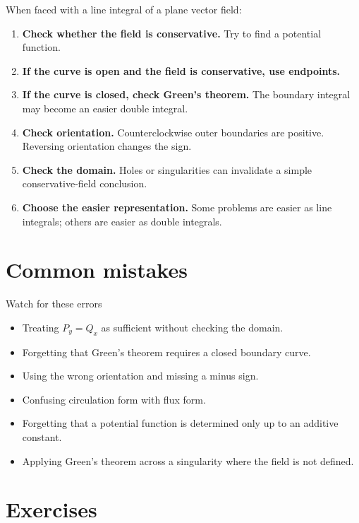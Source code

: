 \documentclass[11pt,oneside]{book}
\begin{document}
When faced with a line integral of a plane vector field:
\begin{enumerate}
  \item \textbf{Check whether the field is conservative.} Try to find a potential function.
  \item \textbf{If the curve is open and the field is conservative, use endpoints.}
  \item \textbf{If the curve is closed, check Green's theorem.} The boundary integral may become an easier double integral.
  \item \textbf{Check orientation.} Counterclockwise outer boundaries are positive. Reversing orientation changes the sign.
  \item \textbf{Check the domain.} Holes or singularities can invalidate a simple conservative-field conclusion.
  \item \textbf{Choose the easier representation.} Some problems are easier as line integrals; others are easier as double integrals.
\end{enumerate}

\section{Common mistakes}

\begin{warningbox}{Watch for these errors}
\begin{itemize}
  \item Treating $P_y=Q_x$ as sufficient without checking the domain.
  \item Forgetting that Green's theorem requires a closed boundary curve.
  \item Using the wrong orientation and missing a minus sign.
  \item Confusing circulation form with flux form.
  \item Forgetting that a potential function is determined only up to an additive constant.
  \item Applying Green's theorem across a singularity where the field is not defined.
\end{itemize}
\end{warningbox}

\section{Exercises}
\end{document}
